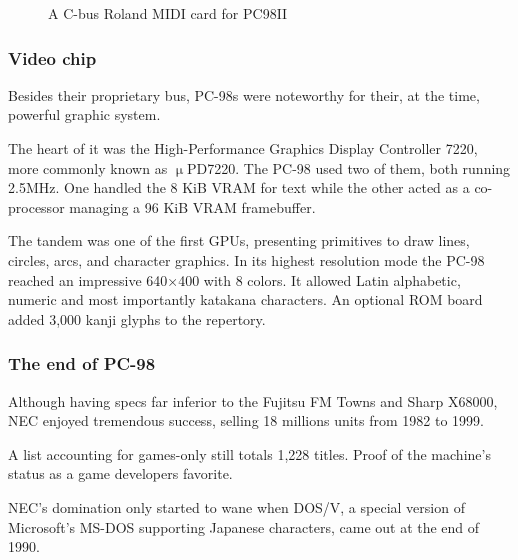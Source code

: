 \begin{figure}[H]

\caption*{A C-bus Roland MIDI card for PC98II}
\end{figure}



\subsubsection{Video chip}
Besides their proprietary bus, PC-98s were noteworthy for their, at the time, powerful graphic system.

The heart of it was the High-Performance Graphics Display Controller 7220, more commonly known as $\upmu$PD7220. The PC-98 used two of them, both running 2.5MHz. One handled the 8 KiB VRAM for text while the other acted as a co-processor managing a 96 KiB VRAM framebuffer.

The tandem was one of the first GPUs, presenting primitives to draw lines, circles, arcs, and character graphics. In its highest resolution mode the PC-98 reached an impressive 640×400 with 8 colors. It allowed Latin alphabetic, numeric and most importantly katakana characters. An optional ROM board added 3,000 kanji glyphs to the repertory.   

\subsubsection{The end of PC-98}

Although having specs far inferior to the Fujitsu FM Towns and Sharp X68000, NEC enjoyed tremendous success, selling 18 millions units from 1982 to 1999.


A list accounting for games-only still totals 1,228 titles. Proof of the machine's status as a game developers favorite.

NEC's domination only started to wane when DOS/V, a special version of Microsoft's MS-DOS supporting Japanese characters, came out at the end of 1990.




